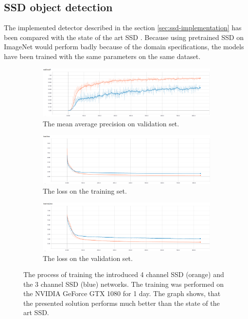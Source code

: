 \documentclass[a4paper,12pt,titlepage, twoside]{article}
\numberwithin{figure}{section}
\begin{document}
\subsection{SSD object detection}
\label{sec:ssd-evaluation}
The implemented detector described in the section \ref{sec:ssd-implementation} has been compared with the state of the art SSD \cite{liu2016ssd}. Because using pretrained SSD on ImageNet would perform badly because of the domain specifications, the models have been trained with the same parameters on the same dataset. 

\begin{figure}[H]
    \begin{subfigure}[Sample1]{1\linewidth} 
    	\includegraphics[width=1\linewidth]{fig/ssd_compare/mAP.png}
        \caption{The mean average precision on validation set.}   
        \label{fig:ssd_mAP}
    \end{subfigure}
    \begin{subfigure}[Sample1]{1\linewidth} 
    	\includegraphics[width=1\linewidth]{fig/ssd_compare/loss.png}
        \caption{The loss on the training set.}   
        \label{fig:ssd_loss}
    \end{subfigure}    
	\begin{subfigure}[Sample1]{1\linewidth} 
    	\includegraphics[width=1\linewidth]{fig/ssd_compare/val_loss.png}
        \caption{The loss on the validation set.}   
        \label{fig:ssd_val_loss}
    \end{subfigure}    
    \caption{The process of training the introduced 4 channel SSD (orange) and the 3 channel SSD (blue) networks. The training was performed on the NVIDIA GeForce GTX 1080 for 1 day. The graph shows, that the presented solution performs much better than the state of the art SSD.}
    \label{fig:ssd_training}
\end{figure}
\end{document}
